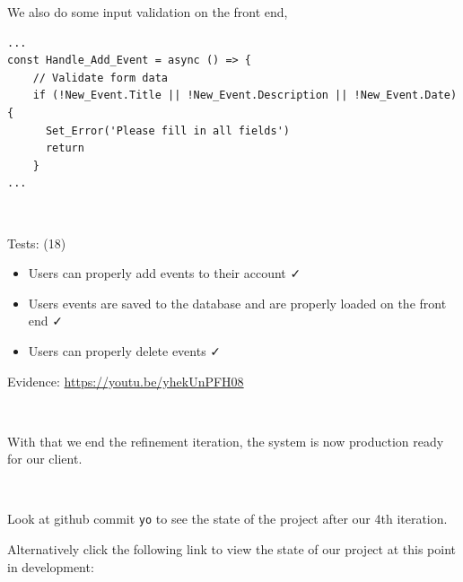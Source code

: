 We also do some input validation on the front end,

\begin{verbatim}
...
const Handle_Add_Event = async () => {
    // Validate form data
    if (!New_Event.Title || !New_Event.Description || !New_Event.Date) {
      Set_Error('Please fill in all fields')
      return
    }
...
\end{verbatim}

{\color{gray} \hrulefill} \\ \vspace{0.2cm}

{\sffamily Tests: (18)}

\begin{itemize}
  \item Users can properly add events to their account \faCheck
  \item Users events are saved to the database and are properly loaded on the front end \faCheck
  \item Users can properly delete events \faCheck
\end{itemize}

{\sffamily Evidence: } \url{https://youtu.be/yhekUnPFH08} \\ \vspace{0.2cm}

{\color{gray} \hrulefill} \\ \vspace{0.2cm}

With that we end the refinement iteration, the system is now production ready for our client. \\ \vspace{0.2cm}

{\color{gray} \hrulefill} \\ \vspace{0.2cm}

Look at github commit \texttt{yo} to see the state of the project after our 4th iteration. \\ \vspace{0.2cm}

Alternatively click the following link to view the state of our project at this point in development: \\
